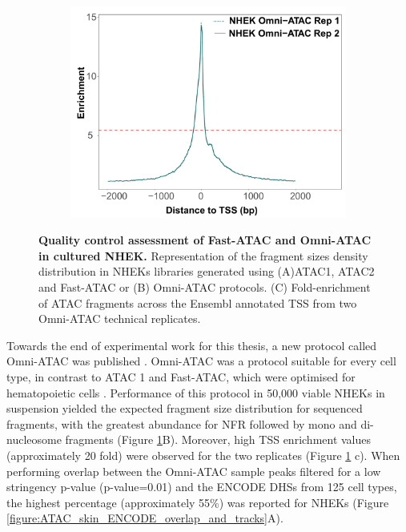 \begin{figure}[htbp]
\begin{subfigure}{0.5\textwidth}
\centering
\includegraphics[width=\textwidth]{./Results1/pdfs/ATAC_skin_TSS_enrichment_NHEK_omni_ATAC}
\caption{\textbf{}} %
\end{subfigure}%
\caption[Quality control assessment of Fast-ATAC and Omni-ATAC in cultured NHEK]{\textbf{Quality control assessment of Fast-ATAC and Omni-ATAC in cultured NHEK.} Representation of the fragment sizes density distribution in NHEKs libraries generated using (A)ATAC1, ATAC2 and Fast-ATAC or (B) Omni-ATAC protocols. (C) Fold-enrichment of ATAC fragments across the Ensembl annotated TSS from two Omni-ATAC technical replicates.}
\label{figure:PS02_skin_ATAC_QC_assessment}
\end{figure} 


Towards the end of experimental work for this thesis, a new protocol called Omni-ATAC was published \parencite{Corces2017}. Omni-ATAC was a protocol suitable for every cell type, in contrast to ATAC 1 and Fast-ATAC, which were optimised for hematopoietic cells \parencite{Buenrostro2013,Corces2016}. Performance of this protocol in 50,000 viable NHEKs in suspension yielded the expected fragment size distribution for sequenced fragments, with the greatest abundance for NFR followed by mono and di-nucleosome fragments (Figure \ref{figure:PS02_skin_ATAC_QC_assessment}B). Moreover, high TSS enrichment values (approximately 20 fold) were observed for the two replicates (Figure \ref{figure:PS02_skin_ATAC_QC_assessment} c). When performing overlap between the Omni-ATAC sample peaks filtered for a low stringency p-value (p-value=0.01) and the ENCODE DHSs from 125 cell types, the highest percentage (approximately 55\%) was reported for NHEKs (Figure \ref{figure:ATAC_skin_ENCODE_overlap_and_tracks}A).

